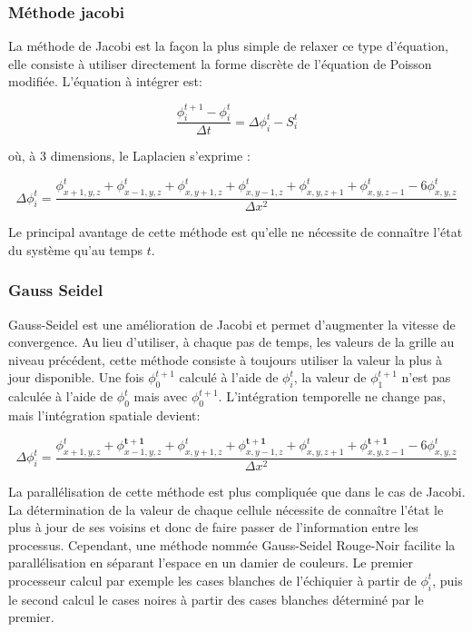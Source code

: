 \subsubsection{Méthode jacobi}

La méthode de Jacobi est la façon la plus simple de relaxer ce type d'équation, elle consiste à utiliser directement la forme discrète de l'équation de Poisson modifiée. 
L'équation à intégrer est:

\[ \dfrac{\phi^{t+1}_i - \phi^{t}_i}{\Delta t}  =  \Delta \phi_i^t - S_i^t \]

où, à 3 dimensions, le Laplacien s'exprime :

\[ \Delta \phi_i^t = \dfrac{\phi_{x+1,y,z}^t  + \phi_{x-1,y,z}^t + \phi_{x,y+1,z}^t  + \phi_{x,y-1,z}^t + \phi_{x,y,z+1}^t + \phi_{x,y,z-1}^t	- 6\phi_{x,y,z}^t}{\Delta x ^2} \]
		
Le principal avantage de cette méthode est qu'elle ne nécessite de connaître l'état du système qu'au temps $t$.

\subsubsection{Gauss Seidel}
Gauss-Seidel est une amélioration de Jacobi et permet d'augmenter la vitesse de convergence.%
Au lieu d'utiliser, à chaque pas de temps, les valeurs de la grille au niveau précédent, cette méthode consiste à toujours utiliser la valeur la plus à jour disponible. 
Une fois $\phi^{t+1}_0$ calculé à l'aide de $\phi^{t}_i$, la valeur de $\phi^{t+1}_1$ n'est pas calculée à l'aide de $\phi^{t}_0$ mais avec $\phi^{t+1}_0$. 
L'intégration temporelle ne change pas, mais l'intégration spatiale devient: 

\[ \Delta \phi_i^t = \dfrac{\phi_{x+1,y,z}^t  + \phi_{x-1,y,z}^\mathbf{t+1} + \phi_{x,y+1,z}^t  + \phi_{x,y-1,z}^\mathbf{t+1} + \phi_{x,y,z+1}^t + \phi_{x,y,z-1}^\mathbf{t+1}	- 6\phi_{x,y,z}^t}{\Delta x ^2} \]

La parallélisation de cette méthode est plus compliquée que dans le cas de Jacobi. 
La détermination de la valeur de chaque cellule nécessite de connaître l'état le plus à jour de ses voisins et donc de faire passer de l'information entre les processus.
Cependant, une méthode nommée Gauss-Seidel Rouge-Noir facilite la parallélisation en séparant l'espace en un damier de couleurs. 
Le premier processeur calcul par exemple les cases blanches de l'échiquier à partir de $\phi_i^t$, puis le second calcul le cases noires à partir des cases blanches déterminé par le premier.



